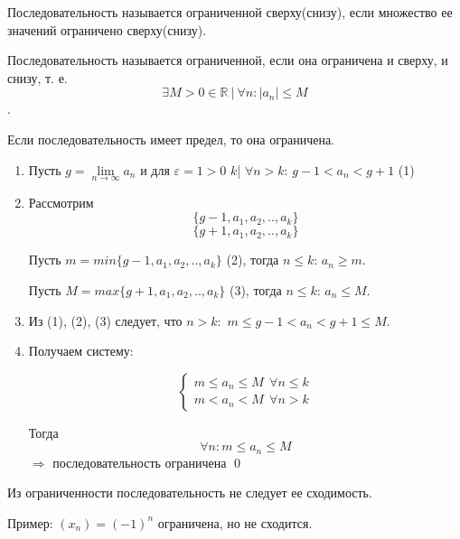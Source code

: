 \documentclass{article}
\begin{document}
Последовательность называется ограниченной сверху(снизу), если множество ее значений ограничено сверху(снизу).

Последовательность называется ограниченной, если она ограничена и сверху, и снизу, т. е. $$\exists M>0\in \mathbb{R}\ | \ \forall n: |a_n|\leq M$$.

\theorem

Если последовательность имеет предел, то она ограничена.

\proof

\begin{enumerate}

	\item Пусть $g=\lim\limits_{n\to\infty}{a_n}$ и для  $\varepsilon=1>0$ \exist $k$| $\forall n>k$: $g-1<a_n<g+1$ (1)

	\item Рассмотрим $$\{g-1, a_1, a_2,.., a_k\}$$
	      $$\{g+1, a_1, a_2,.., a_k\}$$

	      Пусть $m=min\{g-1, a_1, a_2,.., a_k\}$ (2), тогда \forall $n\leq k$: $a_n \geq m$.

	      Пусть $M=max\{g+1, a_1, a_2,.., a_k\}$ (3), тогда \forall $n\leq k$: $a_n \leq M$.

	\item Из (1), (2), (3) следует, что \forall $n>k$:\
	      $m\leq g-1<a_n<g+1\leq M$.

	\item Получаем систему:

	      \begin{equation*}
		      \begin{cases}
			      m\leq a_n\leq M  \ \ \forall n\leq k
			      \\
			      m < a_n < M \ \ \forall n>k
		      \end{cases}
	      \end{equation*}

	      Тогда $$\forall n: m\leq a_n\leq M$$ $\Rightarrow$ последовательность ограничена \qed

\end{enumerate}

Из ограниченности последовательность не следует ее сходимость.

Пример: $(x_n)=(-1)^n$ ограничена, но не сходится.
\end{document}

